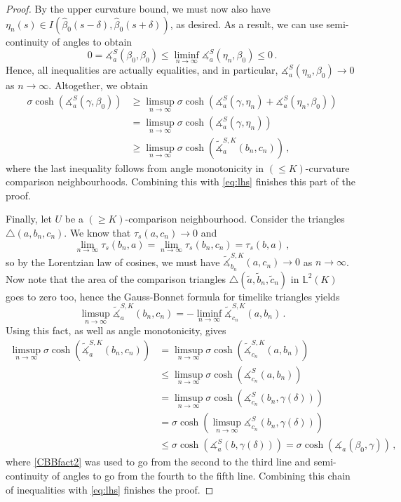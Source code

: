 \documentclass[11pt,reqno]{amsart}
\theoremstyle{definition}
\newcommand{\Cref}[1]{\zcref[S]{#1}}
\theoremstyle{definition}
\theoremstyle{plain}
\theoremstyle{remark}
\newcommand{\ma}{\measuredangle}
\begin{document}
\begin{proof}
    By the upper curvature bound, we must now also have $\eta_n(s)\in I(\hat\beta_0(s-\delta),\hat\beta_0(s+\delta))$, as desired. 
    As a result, we can use semi-continuity of angles to obtain
    \begin{equation*}
        0=\ma_a^S(\beta_0,\beta_0)\leq\liminf_{n\to\infty}\ma_a^S(\eta_n,\beta_0)\leq0 \, .
    \end{equation*}
    Hence, all inequalities are actually equalities, and in particular, $\ma_a^S(\eta_n,\beta_0)\to0$ as $n\to\infty$. Altogether, we obtain 
    \begin{equation*}
        \begin{split}
            \sigma\cosh(\ma_a^S(\gamma,\beta_0))&\geq\limsup_{n\to\infty}\sigma\cosh(\ma_a^S(\gamma,\eta_n)+\ma_a^S(\eta_n,\beta_0))\\
            &=\limsup_{n\to\infty}\sigma\cosh(\ma_a^S(\gamma,\eta_n))\\
            &\geq\limsup_{n\to\infty}\sigma\cosh(\widetilde\ma_a^{S,K}(b_n,c_n)) \, ,
        \end{split}
    \end{equation*}
    where the last inequality follows from angle monotonicity in $(\leq K)$-curvature comparison neighbourhoods. Combining this with \eqref{eq:lhs} finishes this part of the proof.

    Finally, let $U$ be a $(\geq K)$-comparison neighbourhood. Consider the triangles $\triangle (a,b_n, c_n)$. We know that $\tau_s(a,c_n)\to 0$ and 
    \[\lim_{n\to\infty}\tau_s(b_n,a)=\lim_{n\to\infty}\tau_s(b_n,c_n)=\tau_s(b,a)\, ,\]
    so by the Lorentzian law of cosines, we must have $\widetilde\ma_{b_n}^{S,K}(a,c_n)\to 0$ as $n\to\infty$. Now note that the area of the comparison triangles $\triangle(\tilde a,\tilde b_n, \tilde c_n)$ in $\mathbb L^2(K)$ goes to zero too, hence the Gauss-Bonnet formula \Cref{gbtt} for timelike triangles yields 
    \[\limsup_{n\to\infty}\widetilde\ma_a^{S,K}(b_n,c_n)=-\liminf_{n\to\infty}\widetilde\ma_{c_n}^{S,K}(a,b_n) \, .\]
    Using this fact, as well as angle monotonicity, gives
    \begin{align*}
        \limsup_{n\to\infty}\sigma\cosh(\widetilde\ma_a^{S,K}(b_n,c_n))&=\limsup_{n\to\infty}\sigma\cosh(\widetilde\ma_{c_n}^{S,K}(a,b_n))\\\
        &\leq\limsup_{n\to\infty}\sigma\cosh(\ma^S_{c_n}(a,b_n))\\
        &=\limsup_{n\to\infty}\sigma\cosh(\ma^S_{c_n}(b_n,\gamma(\delta)))\\
        &=\sigma\cosh\left(\limsup_{n\to\infty}\ma^S_{c_n}(b_n,\gamma(\delta))\right)\\\
        &\leq\sigma\cosh(\ma_a^S(b,\gamma(\delta)))=\sigma\cosh(\ma_a(\beta_0,\gamma)) \, ,
    \end{align*}
    where \Cref{rem:CBBfact}\ref{CBBfact2} was used to go from the second to the third line and semi-continuity of angles to go from the fourth to the fifth line. Combining this chain of inequalities with \eqref{eq:lhs} finishes the proof.
\end{proof}
\end{document}
